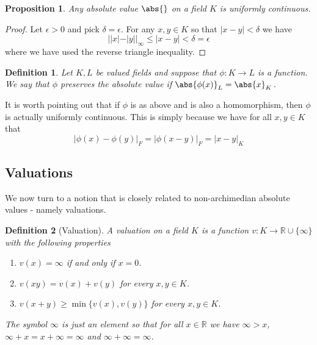 \documentclass{article}
\newtheorem{definition}{Definition}[section]
\newtheorem{proposition}{Proposition}[section]
\newcommand{\mbb}[1]{\mathbb{#1}}
\numberwithin{equation}{section}
\begin{document}
\begin{proposition}
	Any absolute value $\abs{}$ on a field $K$ is uniformly continuous.
\end{proposition}
\begin{proof}
	Let $\epsilon > 0$ and pick $\delta = \epsilon$. For any $x,y \in K$ so that $|x - y| < \delta$ we have
	$$||x| - |y||_\infty \leq |x - y| < \delta = \epsilon$$
	where we have used the reverse triangle inequality.
\end{proof}


\begin{definition}
	Let $K, L$ be valued fields and suppose that $\phi : K \to L$ is a function. We say that $\phi$ preserves the absolute value if $\abs{\phi(x)}_L = \abs{x}_K$.
\end{definition}

It is worth pointing out that if $\phi$ is as above and is also a homomorphism, then $\phi$ is actually uniformly continuous. This is simply because we have for all $x,y \in K$ that
$$|\phi(x) - \phi(y)|_F = |\phi(x-y)|_F = |x-y|_K$$




\subsection{Valuations}
We now turn to a notion that is closely related to non-archimedian absolute values - namely valuations.

\begin{definition}[Valuation]\label{def: Valuation}
	A valuation on a field $K$ is a function $v : K \to \mbb R \cup \{\infty\}$ with the following properties
	\begin{enumerate}
    	\item $v(x) = \infty$ if and only if $x = 0$.
    	\item $v(xy) = v(x) + v(y)$ for every $x,y \in K$.
    	\item $v(x + y) \geq \min \{v(x), v(y)\}$ for every $x,y \in K$.
	\end{enumerate}
	The symbol $\infty$ is just an element so that for all $x \in \mbb R$ we have $\infty > x$,  $\infty + x = x + \infty = \infty$ and $\infty + \infty = \infty$.
\end{definition}
\end{document}

